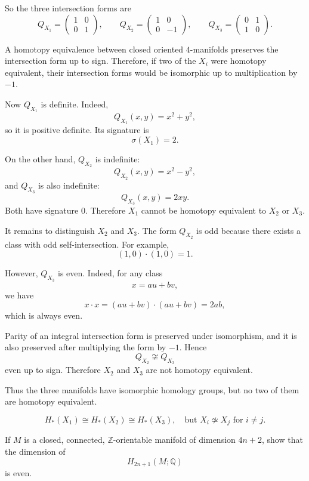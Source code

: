 \begin{solution}
So the three intersection forms are
\[
Q_{X_1}=
\begin{pmatrix}
	1 & 0\\
	0 & 1
\end{pmatrix},
\qquad
Q_{X_2}=
\begin{pmatrix}
	1 & 0\\
	0 & -1
\end{pmatrix},
\qquad
Q_{X_3}=
\begin{pmatrix}
	0 & 1\\
	1 & 0
\end{pmatrix}.
\]

A homotopy equivalence between closed oriented \(4\)-manifolds preserves the
intersection form up to sign. Therefore, if two of the \(X_i\) were homotopy
equivalent, their intersection forms would be isomorphic up to multiplication by
\(-1\).

Now \(Q_{X_1}\) is definite. Indeed,
\[
Q_{X_1}(x,y)=x^2+y^2,
\]
so it is positive definite. Its signature is
\[
\sigma(X_1)=2.
\]

On the other hand, \(Q_{X_2}\) is indefinite:
\[
Q_{X_2}(x,y)=x^2-y^2,
\]
and \(Q_{X_3}\) is also indefinite:
\[
Q_{X_3}(x,y)=2xy.
\]
Both have signature \(0\). Therefore \(X_1\) cannot be homotopy equivalent to
\(X_2\) or \(X_3\).

It remains to distinguish \(X_2\) and \(X_3\). The form \(Q_{X_2}\) is odd because
there exists a class with odd self-intersection. For example,
\[
(1,0)\cdot (1,0)=1.
\]

However, \(Q_{X_3}\) is even. Indeed, for any class
\[
x=au+bv,
\]
we have
\[
x\cdot x=(au+bv)\cdot(au+bv)
=2ab,
\]
which is always even.

Parity of an integral intersection form is preserved under isomorphism, and it is
also preserved after multiplying the form by \(-1\). Hence
\[
Q_{X_2}\not\cong Q_{X_3}
\]
even up to sign. Therefore \(X_2\) and \(X_3\) are not homotopy equivalent.

Thus the three manifolds have isomorphic homology groups, but no two of them are
homotopy equivalent.

\[
\boxed{
	H_*(X_1)\cong H_*(X_2)\cong H_*(X_3),
	\quad
	\text{but } X_i\not\simeq X_j \text{ for } i\neq j.
}
\]
\end{solution}

\begin{problem}
If \(M\) is a closed, connected, \(\mathbb Z\)-orientable manifold of dimension \(4n+2\), show that
the dimension of
\[
H_{2n+1}(M;\mathbb Q)
\]
is even.

\par

\noindent
\end{problem}

